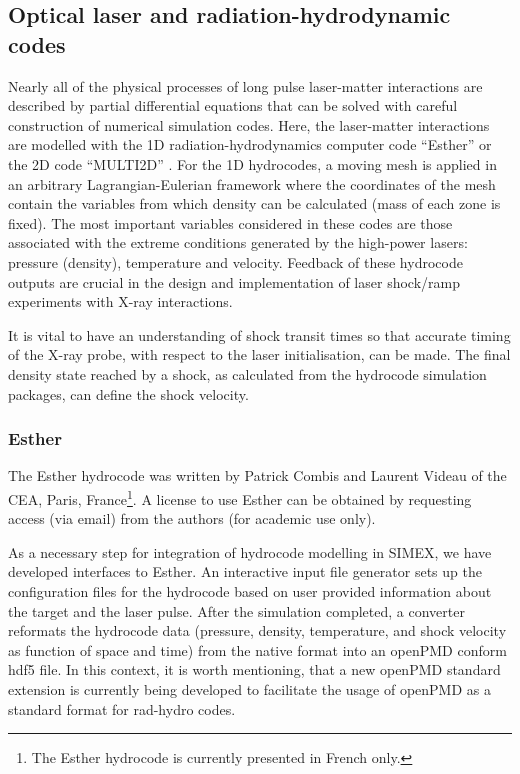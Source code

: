 \documentclass[10pt]{scrartcl}
\begin{document}
\subsection{Optical laser and radiation-hydrodynamic codes}
Nearly all of the physical processes of long pulse laser-matter interactions are described by partial differential
equations that can be solved with careful construction of numerical simulation codes. Here, the laser-matter
interactions are modelled with the 1D radiation-hydrodynamics computer code ``Esther'' \cite{Colombier2005}
or the 2D code ``MULTI2D'' \cite{Ramis2009}.
For the 1D hydrocodes, a moving mesh is applied in an arbitrary Lagrangian-Eulerian framework where the coordinates of
the mesh contain the variables from which density can be calculated (mass of
each zone is fixed). The most important variables
considered in these codes are those associated with the extreme conditions generated by the high-power lasers: pressure (density),
temperature and velocity. Feedback of these hydrocode outputs are crucial in the design and implementation of laser shock/ramp
experiments with X-ray interactions.

It is vital to have an understanding of shock transit times so that accurate timing of the X-ray probe,
with respect to the laser initialisation, can be made. The final density state reached by a shock, as calculated
from the hydrocode simulation packages, can define the shock velocity.

\subsubsection{Esther}
The Esther hydrocode was written by Patrick Combis and Laurent Videau of the
CEA, Paris, France\footnote{The Esther hydrocode is currently presented in
French only.}.
A license to use Esther can be obtained by requesting access (via email) from the authors (for academic use only).

As a necessary step for integration of hydrocode modelling in SIMEX, we have
developed interfaces to Esther. An interactive input file generator sets up
the configuration files for the hydrocode based on user provided information
about the target and the laser pulse. After the simulation completed, a
converter reformats the hydrocode data (pressure, density, temperature, and
shock velocity as function of space and time) from the native format into an
openPMD \cite{openPMD} conform hdf5 file. In this context, it is worth mentioning, that a new
openPMD standard extension is currently being developed to facilitate the
usage of openPMD as a standard format for rad-hydro codes.
\end{document}
